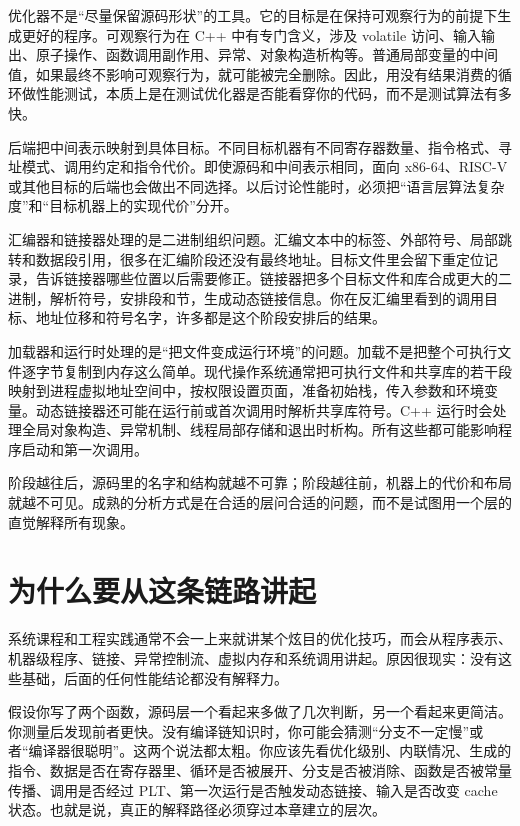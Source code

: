 优化器不是“尽量保留源码形状”的工具。它的目标是在保持可观察行为的前提下生成更好的程序。可观察行为在 C++ 中有专门含义，涉及 volatile 访问、输入输出、原子操作、函数调用副作用、异常、对象构造析构等。普通局部变量的中间值，如果最终不影响可观察行为，就可能被完全删除。因此，用没有结果消费的循环做性能测试，本质上是在测试优化器是否能看穿你的代码，而不是测试算法有多快。

后端把中间表示映射到具体目标。不同目标机器有不同寄存器数量、指令格式、寻址模式、调用约定和指令代价。即使源码和中间表示相同，面向 x86-64、RISC-V 或其他目标的后端也会做出不同选择。以后讨论性能时，必须把“语言层算法复杂度”和“目标机器上的实现代价”分开。

汇编器和链接器处理的是二进制组织问题。汇编文本中的标签、外部符号、局部跳转和数据段引用，很多在汇编阶段还没有最终地址。目标文件里会留下重定位记录，告诉链接器哪些位置以后需要修正。链接器把多个目标文件和库合成更大的二进制，解析符号，安排段和节，生成动态链接信息。你在反汇编里看到的调用目标、地址位移和符号名字，许多都是这个阶段安排后的结果。

加载器和运行时处理的是“把文件变成运行环境”的问题。加载不是把整个可执行文件逐字节复制到内存这么简单。现代操作系统通常把可执行文件和共享库的若干段映射到进程虚拟地址空间中，按权限设置页面，准备初始栈，传入参数和环境变量。动态链接器还可能在运行前或首次调用时解析共享库符号。C++ 运行时会处理全局对象构造、异常机制、线程局部存储和退出时析构。所有这些都可能影响程序启动和第一次调用。

\begin{keyidea}
阶段越往后，源码里的名字和结构就越不可靠；阶段越往前，机器上的代价和布局就越不可见。成熟的分析方式是在合适的层问合适的问题，而不是试图用一个层的直觉解释所有现象。
\end{keyidea}

\section{为什么要从这条链路讲起}

系统课程和工程实践通常不会一上来就讲某个炫目的优化技巧，而会从程序表示、机器级程序、链接、异常控制流、虚拟内存和系统调用讲起。原因很现实：没有这些基础，后面的任何性能结论都没有解释力。

假设你写了两个函数，源码层一个看起来多做了几次判断，另一个看起来更简洁。你测量后发现前者更快。没有编译链知识时，你可能会猜测“分支不一定慢”或者“编译器很聪明”。这两个说法都太粗。你应该先看优化级别、内联情况、生成的指令、数据是否在寄存器里、循环是否被展开、分支是否被消除、函数是否被常量传播、调用是否经过 PLT、第一次运行是否触发动态链接、输入是否改变 cache 状态。也就是说，真正的解释路径必须穿过本章建立的层次。

